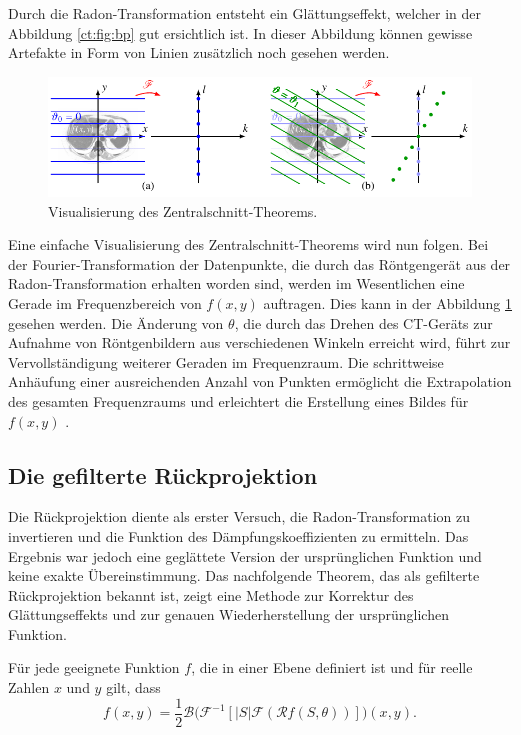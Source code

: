 Durch die Radon-Transformation entsteht ein Glättungseffekt, welcher in  der Abbildung \ref{ct:fig:bp} gut ersichtlich ist. In dieser Abbildung können gewisse Artefakte in Form von Linien zusätzlich noch gesehen werden.

\begin{figure}
	\centering
	\includegraphics{papers/ct/images/zentralschnitt.pdf}
	\caption{Visualisierung des Zentralschnitt-Theorems.}
	\label{ct:img:central-slice}
\end{figure}
Eine einfache Visualisierung des Zentralschnitt-Theorems wird nun folgen. Bei der Fourier-Transformation der Datenpunkte, die durch das Röntgengerät aus der Radon-Transformation erhalten worden sind, werden im Wesentlichen eine Gerade im Frequenzbereich von $f(x, y)$ auftragen. Dies kann in der Abbildung \ref{ct:img:central-slice} gesehen werden. 
Die Änderung von $\theta$, die durch das Drehen des CT-Geräts zur Aufnahme von Röntgenbildern aus verschiedenen Winkeln erreicht wird, führt zur Vervollständigung weiterer Geraden im Frequenzraum. Die schrittweise Anhäufung einer ausreichenden Anzahl von Punkten ermöglicht die Extrapolation des gesamten Frequenzraums und erleichtert die Erstellung eines Bildes für $f(x, y)$ \cite{ct:condensate}.


\subsection{Die gefilterte Rückprojektion
	\label{ct:subsection:gefilterterueck}}
Die Rückprojektion diente als erster Versuch, die Radon-Transformation zu invertieren und die Funktion des Dämpfungskoeffizienten zu ermitteln. Das Ergebnis war jedoch eine geglättete Version der ursprünglichen Funktion und keine exakte Übereinstimmung. Das nachfolgende Theorem, das als gefilterte Rückprojektion bekannt ist, zeigt eine Methode zur Korrektur des Glättungseffekts und zur genauen Wiederherstellung der ursprünglichen Funktion.

\begin{satz}
	Für jede geeignete Funktion $f$, die in einer Ebene definiert ist und für reelle Zahlen $x$ und $y$ gilt, dass
	\begin{equation}
		f(x, y) = \dfrac{1}{2}\mathscr{B}\biggl(\mathscr{F}^{-1}[|S|\mathscr{F}(\mathscr{R}f(S, \theta))]\biggr)(x,y).
	\end{equation}
\end{satz}

